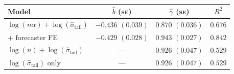 \begin{tabular}{lccc}
\toprule
Model & $\hat{b}$ (\textsc{se}) & $\hat{\gamma}$ (\textsc{se}) & $R^2$ \\
\midrule
  $\log(n\alpha) + \log(\hat{\sigma}_{\mathrm{tail}})$ &
    $-0.436$ $(0.039)$ &
    $0.870$ $(0.036)$ &
    $0.676$ \\
  \quad + forecaster FE &
    $-0.429$ $(0.028)$ &
    $0.943$ $(0.027)$ &
    $0.842$ \\
  $\log(n) + \log(\hat{\sigma}_{\mathrm{tail}})$ &
    --- &
    $0.926$ $(0.047)$ &
    $0.529$ \\
  $\log(\hat{\sigma}_{\mathrm{tail}})$ only &
    --- &
    $0.926$ $(0.047)$ &
    $0.529$ \\
\bottomrule
\end{tabular}